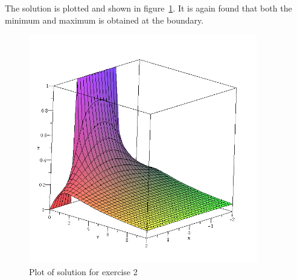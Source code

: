     The solution is plotted and shown in figure~\ref{fig:q2-plot}. It is again found that both the minimum and maximum is obtained at the boundary.
    \begin{figure}[ht]
        \centering
        \includegraphics[width=100mm]{q2-plot.png}
        \caption{Plot of solution for exercise 2}
        \label{fig:q2-plot}
    \end{figure}

